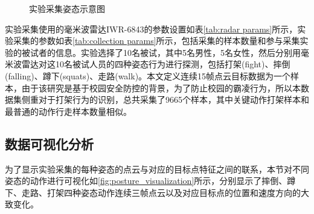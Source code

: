 \begin{figure}[htbp]
	\centering
	\caption{实验采集姿态示意图}
	\label{fig:posture collection}
\end{figure}
实验采集使用的毫米波雷达IWR-6843的参数设置如表\eqref{tab:radar params}所示，实验采集的参数如表\eqref{tab:collection params}所示，包括采集的样本数量和参与采集实验的被试者的信息。实验选择了10名被试，其中5名男性，5名女性，然后分别用毫米波雷达对这10名被试人员的四种姿态行为进行探测，包括打架(fight)、摔倒(falling)、蹲下(squats)、走路(walk)。本文定义连续15帧点云目标数据为一个样本，由于该研究是基于校园安全防控的背景，为了防止校园的霸凌行为，所以本数据集侧重对于打架行为的识别，总共采集了9665个样本，其中关键动作打架样本和最普通的动作行走样本数量相似。

\subsection{数据可视化分析}
为了显示实验采集的每种姿态的点云与对应的目标点特征之间的联系，本节对不同姿态的动作进行可视化如\eqref{fig:posture_visualization}所示，分别显示了摔倒、蹲下、走路、打架四种姿态动作连续三帧点云以及对应目标点的位置和速度方向的大致变化。

